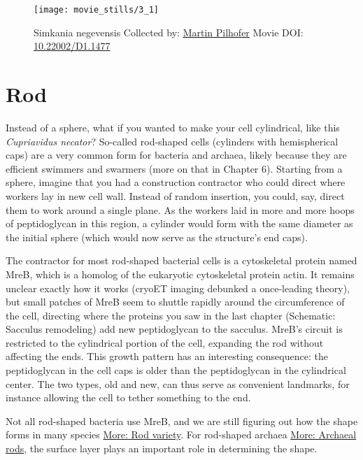 \documentclass[]{tufte-book}
\begin{document}
\begin{figure}
\texttt{[image: movie\_stills/3\_1]} \caption[Simkania negevensis Collected by:
\protect\hyperlink{martin_pilhofer}{Martin Pilhofer} Movie DOI:
\href{https://doi.org/10.22002/D1.1477}{10.22002/D1.1477}]{Simkania negevensis Collected by:
\protect\hyperlink{martin_pilhofer}{Martin Pilhofer} Movie DOI:
\href{https://doi.org/10.22002/D1.1477}{10.22002/D1.1477}}\label{fig:3-1}
\end{figure}

\section{Rod}\label{rod}

Instead of a sphere, what if you wanted to make your cell cylindrical,
like this \emph{Cupriavidus necator}? So-called rod-shaped cells
(cylinders with hemispherical caps) are a very common form for bacteria
and archaea, likely because they are efficient swimmers and swarmers
(more on that in Chapter 6). Starting from a sphere, imagine that you
had a construction contractor who could direct where workers lay in new
cell wall. Instead of random insertion, you could, say, direct them to
work around a single plane. As the workers laid in more and more hoops
of peptidoglycan in this region, a cylinder would form with the same
diameter as the initial sphere (which would now serve as the structure's
end caps).

The contractor for most rod-shaped bacterial cells is a cytoskeletal
protein named MreB, which is a homolog of the eukaryotic cytoskeletal
protein actin. It remains unclear exactly how it works (cryoET imaging
debunked a once-leading theory), but small patches of MreB seem to
shuttle rapidly around the circumference of the cell, directing where
the proteins you saw in the last chapter (Schematic: Sacculus
remodeling) add new peptidoglycan to the sacculus. MreB's circuit is
restricted to the cylindrical portion of the cell, expanding the rod
without affecting the ends. This growth pattern has an interesting
consequence: the peptidoglycan in the cell caps is older than the
peptidoglycan in the cylindrical center. The two types, old and new, can
thus serve as convenient landmarks, for instance allowing the cell to
tether something to the end.

Not all rod-shaped bacteria use MreB, and we are still figuring out how
the shape forms in many species \protect\hyperlink{Rod_variety}{More:
Rod variety}. For rod-shaped archaea
\protect\hyperlink{Archaeal_rods}{More: Archaeal rods}, the surface
layer plays an important role in determining the shape.
\end{document}
